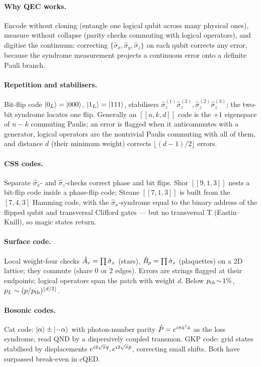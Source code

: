 \clearpage
\begin{chaptersummary}

\paragraph{Why QEC works.}
Encode without cloning (entangle one logical qubit across many physical
ones), measure without collapse (parity checks commuting with logical
operators), and digitise the continuum: correcting
$\{\hat\sigma_x,\hat\sigma_y,\hat\sigma_z\}$ on each qubit corrects any
error, because the syndrome measurement projects a continuous error onto
a definite Pauli branch.

\paragraph{Repetition and stabilisers.}
Bit-flip code $\ket{0_L}=\ket{000}$, $\ket{1_L}=\ket{111}$, stabilisers
$\hat\sigma_z^{(1)}\hat\sigma_z^{(2)},\hat\sigma_z^{(2)}\hat\sigma_z^{(3)}$;
the two-bit syndrome locates one flip. Generally an $[[n,k,d]]$ code is
the $+1$ eigenspace of $n-k$ commuting Paulis; an error is flagged when
it anticommutes with a generator, logical operators are the nontrivial
Paulis commuting with all of them, and distance $d$ (their minimum
weight) corrects $\lfloor(d-1)/2\rfloor$ errors.

\paragraph{CSS codes.}
Separate $\hat\sigma_x$- and $\hat\sigma_z$-checks correct phase and bit
flips. Shor $[[9,1,3]]$ nests a bit-flip code inside a phase-flip code;
Steane $[[7,1,3]]$ is built from the $[7,4,3]$ Hamming code, with the
$\hat\sigma_x$-syndrome equal to the binary address of the flipped
qubit and transversal Clifford gates --- but no transversal $\mathrm{T}$
(Eastin--Knill), so magic states return.

\paragraph{Surface code.}
Local weight-four checks $\hat{A}_v=\prod\hat\sigma_x$ (stars),
$\hat{B}_p=\prod\hat\sigma_z$ (plaquettes) on a 2D lattice; they commute
(share $0$ or $2$ edges). Errors are strings flagged at their endpoints;
logical operators span the patch with weight $d$. Below
$p_{\rm th}\!\sim\!1\%$, $p_L\sim(p/p_{\rm th})^{\lfloor d/2\rfloor}$.

\paragraph{Bosonic codes.}
Cat code: $\ket{\alpha}\pm\ket{-\alpha}$ with photon-number parity
$\hat{P}=e^{i\pi\hat{a}^\dagger\hat{a}}$ as the loss syndrome, read QND by a
dispersively coupled transmon. GKP code: grid states stabilised by
displacements $e^{i2\sqrt\pi\hat{q}},e^{i2\sqrt\pi\hat{p}}$, correcting small
shifts. Both have surpassed break-even in cQED.

\end{chaptersummary}

